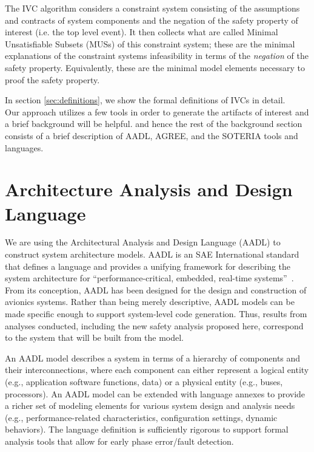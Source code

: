 The IVC algorithm considers a constraint system consisting of the assumptions and contracts of system components and the negation of the safety property of interest (i.e. the top level event). It then collects what are called Minimal Unsatisfiable Subsets (MUSs) of this constraint system; these are the minimal explanations of the constraint systems infeasibility in terms of the \textit{negation} of the safety property. Equivalently, these are the minimal model elements necessary to proof the safety property.

In section \ref{sec:definitions}, we show the formal definitions of IVCs in detail. \\

Our approach utilizes a few tools in order to generate the artifacts of interest and a brief background will be helpful. and hence the rest of the background section consists of a brief description of AADL, AGREE, and the SOTERIA tools and languages. 

\section{Architecture Analysis and Design Language}
We are using the Architectural Analysis and Design Language (AADL) to construct system architecture models.  AADL is an SAE International standard that defines a language and provides a unifying framework for describing the system architecture for ``performance-critical, embedded, real-time systems''~\cite{AADL_Standard,FeilerModelBasedEngineering2012}. From its conception, AADL has been designed for the design and construction of avionics systems.  Rather than being merely descriptive, AADL models can be made specific enough to support system-level code generation.  Thus, results from analyses conducted, including the new safety analysis proposed here, correspond to the system that will be built from the model.  

An AADL model describes a system in terms of a hierarchy of components and their interconnections, where each component can either represent a logical entity (e.g., application software functions, data) or a physical entity (e.g., buses, processors). An AADL model can be extended with language annexes to provide a richer set of modeling elements for various system design and analysis needs (e.g., performance-related characteristics, configuration settings, dynamic behaviors). The language definition is sufficiently rigorous to support formal analysis tools that allow for early phase error/fault detection.

